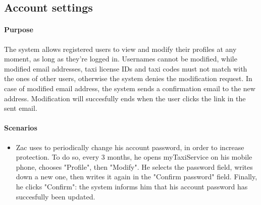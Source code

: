 \subsection{Account settings}
	\paragraph{Purpose}
		The system allows registered users to view and modify their profiles at any moment, as long as they're logged in. Usernames cannot be modified, while modified email addresses, taxi license IDs and taxi codes must not match with the ones of other users, otherwise the system denies the modification request. In case of modified email address, the system sends a confirmation email to the new address. Modification will succesfully ends when the user clicks the link in the sent email.
	
	\paragraph{Scenarios}
		\begin{itemize}
			\item Zac uses to periodically change his account password, in order to increase protection. To do so, every 3 months, he opens myTaxiService on his mobile phone, chooses "Profile", then "Modify". He selects the password field, writes down a new one, then writes it again in the "Confirm password" field. Finally, he clicks "Confirm": the system informs him that his account password has succesfully been updated.
		\end{itemize}
	
